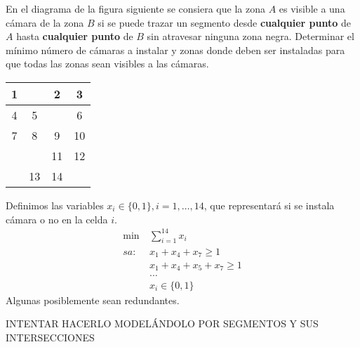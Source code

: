 \documentclass[twoside]{article}
\begin{document}
\newpage

\begin{ejercicio}{10}
En el diagrama de la figura siguiente se consiera que la zona $A$ es visible a una cámara de la zona $B$ si se puede trazar un segmento desde \textbf{cualquier punto} de $A$ hasta \textbf{cualquier punto} de $B$ sin atravesar ninguna zona negra. Determinar el mínimo número de cámaras a instalar y zonas donde deben ser instaladas para que todas las zonas sean visibles a las cámaras.

\begin{center}
\begin{tabular}{|c|c|c|c|}
\hline
1 & \cellcolor{black} & 2 & 3\\
\hline
4 & 5 & \cellcolor{black} & 6\\
\hline
7 & 8 & 9 & 10\\
\hline
\cellcolor{black} & \cellcolor{black}& 11 & 12\\
 \hline
 \cellcolor{black}& 13 & 14 & \cellcolor{black} \\
 \hline
\end{tabular}
\end{center}
\end{ejercicio}
\begin{solucion}
Definimos las variables $x_i\in\{0,1\}, i=1,\dots, 14$, que representará si se instala cámara o no en la celda $i$.
\begin{align*}
\min\ & \sum_{i=1}^{14} x_i\\
sa:\ & x_1+x_4+x_7\geq 1\\
& x_1 + x_4 +x_5 +x_7\geq 1\\
&\dots\\
&x_i\in\{0,1\}
\end{align*}
Algunas posiblemente sean redundantes.

INTENTAR HACERLO MODELÁNDOLO POR SEGMENTOS Y SUS INTERSECCIONES
\end{solucion}

\newpage
\end{document}
